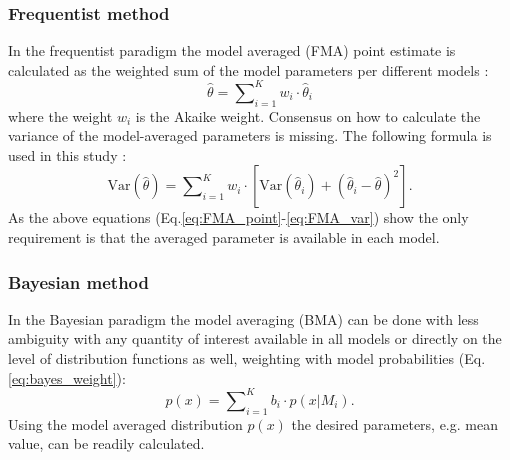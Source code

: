 
\subsubsection*{Frequentist method}

In the frequentist paradigm the model averaged (FMA) point estimate is calculated as the weighted sum of the model parameters per different models \citep{Burnham2002}:
\begin{equation}
	\label{eq:FMA_point}
	\hat \theta  = \sum\nolimits_{i = 1}^K {{w_i} \cdot {{\hat \theta }_i}} 
\end{equation}
where the weight $w_i$ is the Akaike weight. Consensus on how to calculate the variance of the model-averaged parameters is missing. The following formula is used in this study \citep{Burnham2002}:
\begin{equation}
	\label{eq:FMA_var}
	\mathrm{Var} \left( {\hat \theta } \right) = \sum\nolimits_{i = 1}^K {{w_i} \cdot \left[ {\mathrm{Var}\left( {{{\hat \theta }_i}} \right) + {{\left( {{{\hat \theta }_i} - \hat \theta } \right)}^2}} \right]}.
\end{equation}
As the above equations (Eq.\ref{eq:FMA_point}-\ref{eq:FMA_var}) show the only requirement is that the averaged parameter is available in each model.


\subsubsection*{Bayesian method}

In the Bayesian paradigm the model averaging (BMA) can be done with less ambiguity with any quantity of interest available in all models or directly on the level of distribution functions as well, weighting with model probabilities (Eq.\ref{eq:bayes_weight}): 
\begin{equation}
	\label{eq:BMA}
	p\left( x \right) = \sum\nolimits_{i = 1}^K {{b_i} \cdot {p\left( {x|{M_i}} \right)}}.
\end{equation}
Using the model averaged distribution $p\left( x \right)$ the desired parameters, e.g. mean value, can be readily calculated.


